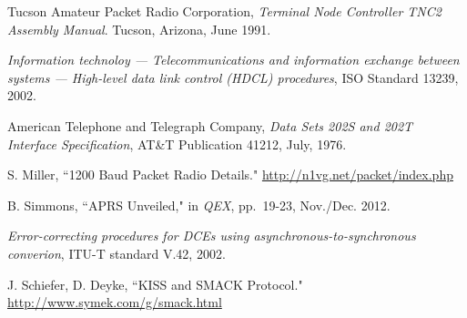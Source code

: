 \begin{thebibliography}{99}
		Tucson Amateur Packet Radio Corporation,
		\emph{Terminal Node Controller TNC2 Assembly Manual}.
		Tucson, Arizona,
		June 1991.

		\emph{Information technoloy --- Telecommunications and information
			exchange between systems --- High-level data link control (HDCL)
		procedures}, ISO Standard 13239, 2002.

		American Telephone and Telegraph Company,
		\emph{Data Sets 202S and 202T Interface Specification},
		AT\&T Publication 41212,
		July, 1976.

		S. Miller,
		``1200 Baud Packet Radio Details."
		\url{http://n1vg.net/packet/index.php}

		B. Simmons,
		``APRS Unveiled," in \emph{QEX},
		pp.~19-23,
		Nov./Dec. 2012.

		\emph{Error-correcting procedures for DCEs using 
		asynchronous-to-synchronous converion}, ITU-T standard V.42, 2002.

		J. Schiefer, D. Deyke,
		``KISS and SMACK Protocol."
		\url{http://www.symek.com/g/smack.html}

\end{thebibliography}

